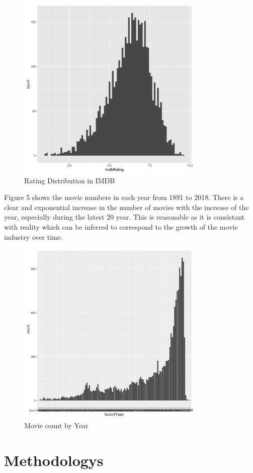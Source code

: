 \documentclass[conference]{IEEEtran}
\begin{document}
\begin{figure}
	\centering
	\includegraphics[width=3.5in]{rating_count.png}
	\caption{Rating Distribution in IMDB}
	\label{fig:side:a}
\end{figure}

Figure 5 shows the movie numbers in each year from 1891 to 2018. There is a clear and exponential increase in the number of movies with the increase of the year, especially during the latest 20 year. This is reasonable as it is consistant with reality which can be inferred to correspond to the growth of the movie industry over time.

\begin{figure}
	\centering
	\includegraphics[width=3.5in]{year_count.png}
	\caption{Movie count by Year}
	\label{fig:side:a}
\end{figure}

\section{Methodologys}
\end{document}
